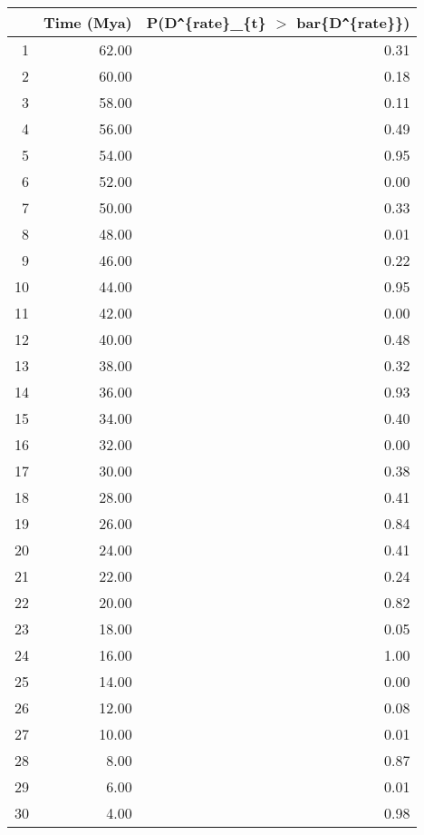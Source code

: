 \begin{table}[ht]
\centering
\begin{tabular}{rrr}
  \hline
 & Time (Mya) & P(D\verb|^|\{rate\}\_\{t\} $>$ bar\{D\verb|^|\{rate\}\}) \\ 
  \hline
1 & 62.00 & 0.31 \\ 
  2 & 60.00 & 0.18 \\ 
  3 & 58.00 & 0.11 \\ 
  4 & 56.00 & 0.49 \\ 
  5 & 54.00 & 0.95 \\ 
  6 & 52.00 & 0.00 \\ 
  7 & 50.00 & 0.33 \\ 
  8 & 48.00 & 0.01 \\ 
  9 & 46.00 & 0.22 \\ 
  10 & 44.00 & 0.95 \\ 
  11 & 42.00 & 0.00 \\ 
  12 & 40.00 & 0.48 \\ 
  13 & 38.00 & 0.32 \\ 
  14 & 36.00 & 0.93 \\ 
  15 & 34.00 & 0.40 \\ 
  16 & 32.00 & 0.00 \\ 
  17 & 30.00 & 0.38 \\ 
  18 & 28.00 & 0.41 \\ 
  19 & 26.00 & 0.84 \\ 
  20 & 24.00 & 0.41 \\ 
  21 & 22.00 & 0.24 \\ 
  22 & 20.00 & 0.82 \\ 
  23 & 18.00 & 0.05 \\ 
  24 & 16.00 & 1.00 \\ 
  25 & 14.00 & 0.00 \\ 
  26 & 12.00 & 0.08 \\ 
  27 & 10.00 & 0.01 \\ 
  28 & 8.00 & 0.87 \\ 
  29 & 6.00 & 0.01 \\ 
  30 & 4.00 & 0.98 \\ 
   \hline
\end{tabular}
\label{tab:rate_peak}
\end{table}
